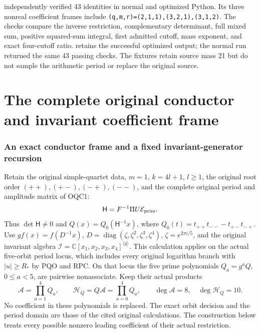  independently verified 43 identities in normal and optimized Python. Its three nonreal coefficient frames include \texttt{(q,m,r)=(2,1,1),(3,2,1),(3,1,2)}. The checks compare the inverse restriction, complementary determinant, full mixed sum, positive squared-sum integral, first admitted cutoff, mass exponent, and exact four-cutoff ratio.  retains the successful optimized output; the normal run returned the same 43 passing checks. The fixtures retain source mass 21 but do not sample the arithmetic period or replace the original source.

\endgroup

\clearpage\begingroup
\part*{The complete original conductor and invariant coefficient frame}
\providecommand{\mrocftightlist}{\setlength{\itemsep}{0pt}\setlength{\parskip}{0pt}}

\section{An exact conductor frame and a fixed invariant-generator recursion}
\label{mrocf:sec:OCF}

Retain the original simple-quartet data, $m=1$, $k=4l+1$,
$l\geq1$, the original root order $(++),(+-),(-+),(--)$, and
the complete original period and amplitude matrix of OQC1:
\[
                  \mathsf H=F^{-1}\Pi U\mathcal E_{\rm prim}.
\]
Thus $\det\mathsf H\ne0$ and
$Q(x)=Q_0(\mathsf H^{-1}x)$, where
$Q_0(t)=t_{++}t_{--}-t_{+-}t_{-+}$.
Use $g f(x)=f(D^{-1}x)$,
$D=\operatorname{diag}(\zeta,\zeta^2,\zeta^3,\zeta^4)$,
$\zeta=e^{2\pi i/5}$, and the original invariant algebra
$\mathscr I=\mathbb C[x_1,x_2,x_3,x_4]^{\langle g\rangle}$.
This calculation applies on the actual five-orbit period locus,
which includes every original logarithm branch with $|u|\geq R_*$
by PQO and RPC. On that locus the five prime polynomials
$Q_a=g^aQ$, $0\leq a<5$, are pairwise nonassociate. Keep their
actual products
\[
 \mathcal A=\prod_{a=1}^4Q_a,\qquad
 \mathcal H_Q=Q\mathcal A=\prod_{a=0}^4Q_a,
 \qquad \deg\mathcal A=8,\quad\deg\mathcal H_Q=10.
 \tag{OCF1}
\]
No coefficient in these polynomials is replaced. The exact orbit
decision and the period domain are those of the cited original
calculations. The construction below treats every possible nonzero
leading coefficient of their actual restriction.

